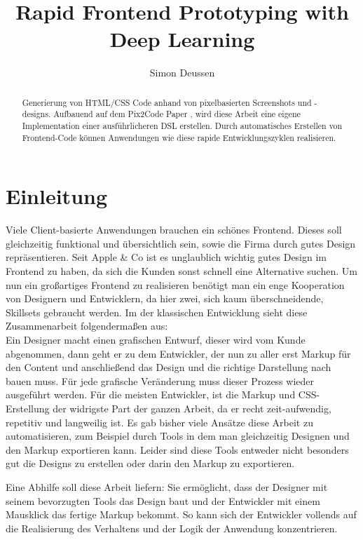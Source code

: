 \documentclass[pdftex,a4paper,halfparskip, article]{scrartcl}
\title{Rapid Frontend Prototyping with Deep Learning} %
\author{Simon Deussen}	%
\begin{document}
\maketitle	

\begin{abstract}
Generierung von HTML/CSS Code anhand von pixelbasierten Screenshots und -designs. Aufbauend auf dem Pix2Code Paper \cite{Beltramelli17}, wird diese Arbeit eine eigene Implementation einer ausführlicheren DSL erstellen. Durch automatisches Erstellen von Frontend-Code können Anwendungen wie diese rapide Entwicklungszyklen realisieren. 
\end{abstract}


\tableofcontents	%
\section{Einleitung} 

Viele Client-basierte Anwendungen brauchen ein schönes Frontend. Dieses soll gleichzeitig funktional und übersichtlich sein, sowie die Firma durch gutes Design repräsentieren. Seit Apple \& Co ist es unglaublich wichtig gutes Design im Frontend zu haben, da sich die Kunden sonst schnell eine Alternative suchen. Um nun ein großartiges Frontend zu realisieren benötigt man ein enge Kooperation von Designern und Entwicklern, da hier zwei, sich kaum überschneidende, Skillsets gebraucht werden. Im der klassischen Entwicklung sieht diese Zusammenarbeit folgendermaßen aus: \\
Ein Designer macht einen grafischen Entwurf, dieser wird vom Kunde abgenommen, dann geht er zu dem Entwickler, der nun zu aller erst Markup für den Content und anschließend das Design und die richtige Darstellung nach bauen muss. Für jede grafische Veränderung muss dieser Prozess wieder ausgeführt werden. Für die meisten Entwickler, ist die Markup und CSS-Erstellung der widrigste Part der ganzen Arbeit, da er recht zeit-aufwendig, repetitiv und langweilig ist. Es gab bisher viele Ansätze diese Arbeit zu automatisieren, zum Beispiel durch Tools in dem man gleichzeitig Designen und den Markup exportieren kann. Leider sind diese Tools entweder nicht besonders gut die Designs zu erstellen oder darin den Markup zu exportieren.

Eine Abhilfe soll diese Arbeit liefern: Sie ermöglicht, dass der Designer mit seinem bevorzugten Tools das Design baut und der Entwickler mit einem Mausklick das fertige Markup bekommt. So kann sich der Entwickler vollends auf die Realisierung des Verhaltens und der Logik der Anwendung konzentrieren. 
\end{document}
